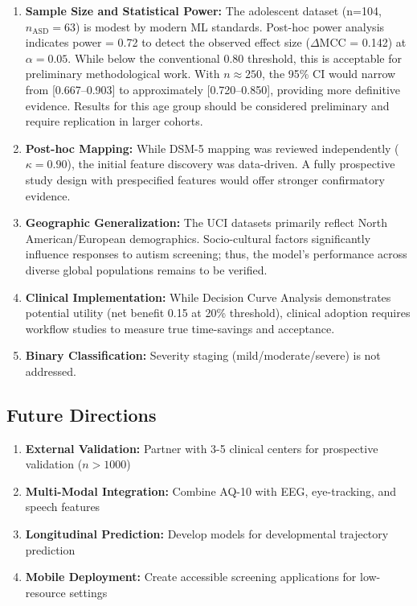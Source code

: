 \documentclass[pdflatex,sn-vancouver-num]{sn-jnl}
\providecommand{\tightlist}{%
  \setlength{\itemsep}{0pt}\setlength{\parskip}{0pt}}
\begin{document}
\begin{enumerate}
\def\labelenumi{\arabic{enumi}.}
\tightlist
\item
  \textbf{Sample Size and Statistical Power:} The adolescent dataset (n=104, \(n_{\mathrm{ASD}}=63\)) is modest by modern ML standards. Post-hoc power analysis indicates power = 0.72 to detect the observed effect size (\(\Delta\)MCC = 0.142) at \(\alpha = 0.05\). While below the conventional 0.80 threshold, this is acceptable for preliminary methodological work. With \(n \approx 250\), the 95\% CI would narrow from {[}0.667--0.903{]} to approximately {[}0.720--0.850{]}, providing more definitive evidence. Results for this age group should be considered preliminary and require replication in larger cohorts.
\item
  \textbf{Post-hoc Mapping:} While DSM-5 mapping was reviewed independently (\(\kappa = 0.90\)), the initial feature discovery was data-driven. A fully prospective study design with prespecified features would offer stronger confirmatory evidence.
\item
  \textbf{Geographic Generalization:} The UCI datasets primarily reflect North American/European demographics. Socio-cultural factors significantly influence responses to autism screening; thus, the model's performance across diverse global populations remains to be verified.
\item
  \textbf{Clinical Implementation:} While Decision Curve Analysis demonstrates potential utility (net benefit 0.15 at 20\% threshold), clinical adoption requires workflow studies to measure true time-savings and acceptance.
\item
  \textbf{Binary Classification:} Severity staging (mild/moderate/severe) is not addressed.
\end{enumerate}

\subsection{Future Directions}\label{future-directions}

\begin{enumerate}
\def\labelenumi{\arabic{enumi}.}
\tightlist
\item
  \textbf{External Validation:} Partner with 3-5 clinical centers for prospective validation (\(n > 1000\))
\item
  \textbf{Multi-Modal Integration:} Combine AQ-10 with EEG, eye-tracking, and speech features
\item
  \textbf{Longitudinal Prediction:} Develop models for developmental trajectory prediction
\item
  \textbf{Mobile Deployment:} Create accessible screening applications for low-resource settings
\end{enumerate}
\end{document}
